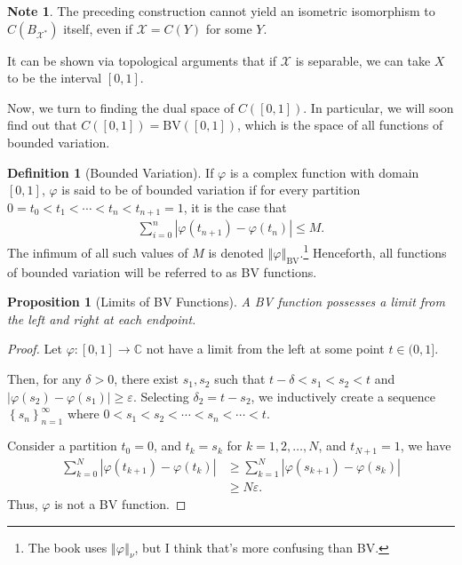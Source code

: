 \documentclass[12pt]{extarticle}
\newcommand{\C}{\mathbb{C}}
\newcommand{\norm}[1]{\left\Vert #1\right\Vert}
\newcommand{\set}[1]{\left\{#1\right\}}
\newcommand{\ve}{\varepsilon}
\theoremstyle{plain}
\newtheorem*{proposition}{Proposition}
\theoremstyle{definition}
\newtheorem*{definition}{Definition}
\theoremstyle{note}
\newtheorem*{note}{Note}
\renewcommand{\newline}{\hfill\break}
\begin{document}
\begin{note}
  The preceding construction cannot yield an isometric isomorphism to $C\left(B_{\mathcal{X}^{\ast}}\right)$ itself, even if $\mathcal{X} = C(Y)$ for some $Y$.\newline

  It can be shown via topological arguments that if $\mathcal{X}$ is separable, we can take $X$ to be the interval $[0,1]$.
\end{note}
Now, we turn to finding the dual space of $C([0,1])$. In particular, we will soon find out that $C([0,1]) = \text{BV}([0,1])$, which is the space of all functions of bounded variation.
\begin{definition}[Bounded Variation]
  If $\varphi$ is a complex function with domain $[0,1]$, $\varphi$ is said to be of bounded variation if for every partition $0 = t_0 < t_1 < \cdots < t_{n} < t_{n+1} = 1$, it is the case that
  \begin{align*}
    \sum_{i=0}^{n}\left\vert \varphi\left(t_{n+1}\right) - \varphi\left(t_{n}\right) \right\vert \leq M.
  \end{align*}
  The infimum of all such values of $M$ is denoted $\norm{\varphi}_{\text{BV}}$.\footnote{The book uses $\norm{\varphi}_{\nu}$, but I think that's more confusing than BV.} Henceforth, all functions of bounded variation will be referred to as BV functions.
\end{definition}
\begin{proposition}[Limits of BV Functions]
  A BV function possesses a limit from the left and right at each endpoint.
\end{proposition}
\begin{proof}
  Let $\varphi: [0,1]\rightarrow \C$ not have a limit from the left at some point $t\in (0,1]$.\newline

  Then, for any $\delta > 0$, there exist $s_1,s_2$ such that $t-\delta < s_1 < s_2 < t$ and $\left\vert \varphi(s_2) - \varphi(s_1) \right\vert \geq \ve$. Selecting $\delta_2 = t - s_2$, we inductively create a sequence $\set{s_n}_{n = 1}^{\infty}$ where $0 < s_1 < s_2 < \cdots < s_n < \cdots < t$.\newline

  Consider a partition $t_0 = 0$, and $t_k= s_k$ for $k = 1,2,\dots,N $, and $t_{N+1} = 1$, we have
  \begin{align*}
    \sum_{k=0}^{N}\left\vert \varphi(t_{k+1}) - \varphi(t_k) \right\vert &\geq \sum_{k=1}^{N}\left\vert \varphi(s_{k+1}) - \varphi(s_{k}) \right\vert\\
                                                                         &\geq N\varepsilon.
  \end{align*}
  Thus, $\varphi$ is not a BV function.
\end{proof}
\end{document}
